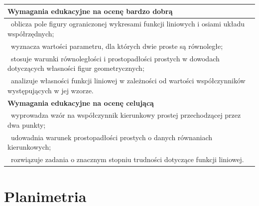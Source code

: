 \documentclass[12pt,a4paper]{article}
\begin{document}
\begin{longtable}{|p{16cm}|}
		\textbf{Wymagania edukacyjne na ocenę bardzo dobrą} \\ \hline
		
		\textbullet\ oblicza pole figury ograniczonej wykresami funkcji liniowych i osiami układu współrzędnych; \\
		
		\textbullet\ wyznacza wartości parametru, dla których dwie proste są równoległe; \\
		
		\textbullet\ stosuje warunki równoległości i prostopadłości prostych w dowodach dotyczących własności figur geometrycznych; \\
		
		\textbullet\ analizuje własności funkcji liniowej w zależności od wartości współczynników występujących w jej wzorze. \\ \hline
		
		\textbf{Wymagania edukacyjne na ocenę celującą} \\ \hline
		
		\textbullet\ wyprowadza wzór na współczynnik kierunkowy prostej przechodzącej przez dwa punkty; \\
		
		\textbullet\ udowadnia warunek prostopadłości prostych o danych równaniach kierunkowych; \\
		
		\textbullet\ rozwiązuje zadania o znacznym stopniu trudności dotyczące funkcji liniowej. \\ \hline
		
	\end{longtable}
	
	\section{Planimetria}
	
\end{document}
